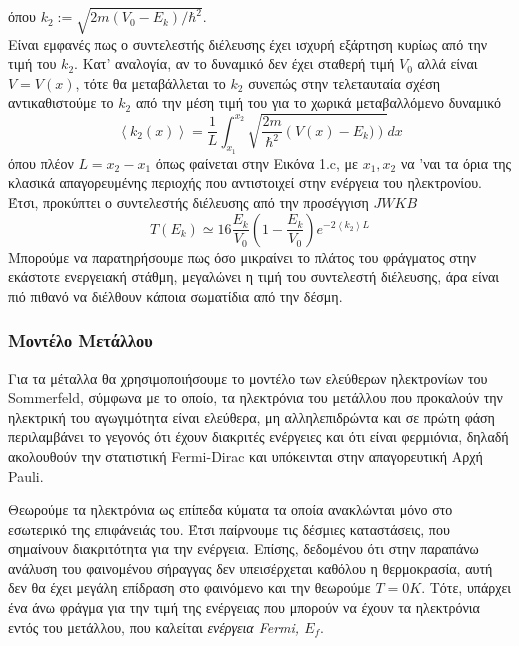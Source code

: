 \documentclass[a4paper]{article}
\begin{document}
όπου $k_2:=\sqrt{ 2m(V_0-E_k)/\hbar^2}$. \\
\newpage
Είναι εμφανές πως ο συντελεστής διέλευσης έχει ισχυρή εξάρτηση κυρίως από την τιμή του $k_2$.
Κατ' αναλογία, αν το δυναμικό δεν έχει σταθερή τιμή $V_0$ αλλά είναι $V=V(x)$, τότε θα μεταβάλλεται το $k_2$ συνεπώς στην τελεταυταία σχέση αντικαθιστούμε το $k_2$ από την μέση τιμή του για το χωρικά μεταβαλλόμενο δυναμικό
\begin{equation}
\left<k_2(x)\right> = \frac{1}{L} \int_{x_1}^{x_2}{ \sqrt{\frac{2m}{\hbar^2}\left(V(x)-E_k)\right)}dx}
\end{equation}
όπου πλέον $L=x_2-x_1$ όπως φαίνεται στην Εικόνα 1.c, με $x_1,x_2$ να 'ναι τα όρια της κλασικά απαγορευμένης περιοχής  που αντιστοιχεί στην ενέργεια του ηλεκτρονίου. Έτσι, προκύπτει ο συντελεστής διέλευσης από την προσέγγιση $JWKB$ 
\begin{equation}\label{6}
T(E_k)\simeq 16\frac{E_k}{V_0}\left(1-\frac{E_k}{V_0}\right) e^{-2\left<k_2\right> L}
\end{equation}
Μπορούμε να παρατηρήσουμε πως όσο μικραίνει το πλάτος του φράγματος στην εκάστοτε ενεργειακή στάθμη, μεγαλώνει η τιμή του συντελεστή διέλευσης, άρα είναι πιό πιθανό να διέλθουν κάποια σωματίδια από την δέσμη.

\subsubsection*{Μοντέλο Μετάλλου}
Για τα μέταλλα θα χρησιμοποιήσουμε το μοντέλο των ελεύθερων ηλεκτρονίων του Sommerfeld, σύμφωνα με το οποίο, τα ηλεκτρόνια του μετάλλου που προκαλούν την ηλεκτρική του αγωγιμότητα είναι ελεύθερα, μη αλληλεπιδρώντα και σε πρώτη φάση περιλαμβάνει το γεγονός ότι έχουν διακριτές ενέργειες και ότι είναι φερμιόνια, δηλαδή ακολουθούν την στατιστική Fermi-Dirac και υπόκεινται στην απαγορευτική Αρχή Pauli. 

Θεωρούμε τα ηλεκτρόνια ως επίπεδα κύματα τα οποία ανακλώνται μόνο στο εσωτερικό της επιφάνειάς του. Έτσι παίρνουμε τις δέσμιες καταστάσεις, που σημαίνουν διακριτότητα για την ενέργεια.
Επίσης, δεδομένου ότι στην παραπάνω ανάλυση του φαινομένου σήραγγας δεν υπεισέρχεται καθόλου η θερμοκρασία, αυτή δεν θα έχει μεγάλη επίδραση στο φαινόμενο και την θεωρούμε $Τ=0K$. Τότε, υπάρχει ένα άνω φράγμα για την 
τιμή της ενέργειας που μπορούν να έχουν τα ηλεκτρόνια εντός του μετάλλου, που καλείται \textit{ενέργεια Fermi, $E_f$}. 
\end{document}
